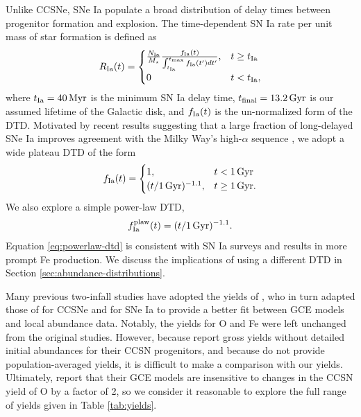 \documentclass[twocolumn,twocolappendix,linenumbers]{aastex631}
\begin{document}
Unlike CCSNe, SNe Ia populate a broad distribution of delay times between progenitor formation and explosion. The time-dependent SN Ia rate per unit mass of star formation is defined as
\begin{equation}
    R_{\rm Ia}(t) = 
    \begin{cases}
        \frac{N_{\rm Ia}}{M_\star}
        \frac{f_{\rm Ia}(t)}{\int_{t_{\rm Ia}}^{t_{\rm max}} f_{\rm Ia}(t') dt'}, & t \ge t_{\rm Ia} \\
        0 & t < t_{\rm Ia},
    \end{cases}
    \label{eq:dtd-function}
\end{equation}
where $t_{\rm Ia}=40\,{\rm Myr}$ is the minimum SN Ia delay time, $t_{\rm final}=13.2\,{\rm Gyr}$ is our assumed lifetime of the Galactic disk, and $f_{\rm Ia}(t)$ is the un-normalized form of the DTD. Motivated by recent results suggesting that a large fraction of long-delayed SNe Ia improves agreement with the Milky Way's high-$\alpha$ sequence \citep{palicio_analytic_2023,dubay_galactic_2024}, we adopt a wide plateau DTD of the form
\begin{equation}
    \label{eq:plateau-dtd}
    f_{\rm Ia}(t) =
    \begin{cases}
        1, & t < 1\,{\rm Gyr} \\
        (t/1\,{\rm Gyr})^{-1.1}, & t \ge 1\,{\rm Gyr}.
    \end{cases}
\end{equation}
We also explore a simple power-law DTD,
\begin{equation}
    f_{\rm Ia}^{\rm plaw}(t) = (t/1\,\rm{Gyr})^{-1.1}.
    \label{eq:powerlaw-dtd}
\end{equation}
Equation \ref{eq:powerlaw-dtd} is consistent with SN Ia surveys \citep[e.g.,][]{maoz_star_2017} and results in more prompt Fe production.
We discuss the implications of using a different DTD in Section \ref{sec:abundance-distributions}.

Many previous two-infall studies have adopted the yields of \citet{francois_evolution_2004}, who in turn adapted those of \citet{woosley_evolution_1995} for CCSNe and \citet{iwamoto_nucleosynthesis_1999} for SNe Ia to provide a better fit between GCE models and local abundance data. Notably, the yields for O and Fe were left unchanged from the original studies. However, because \citet{woosley_evolution_1995} report gross yields without detailed initial abundances for their CCSN progenitors, and because \citet{francois_evolution_2004} do not provide population-averaged yields, it is difficult to make a comparison with our yields. Ultimately, \citet{francois_evolution_2004} report that their GCE models are insensitive to changes in the CCSN yield of O by a factor of 2, so we consider it reasonable to explore the full range of yields given in Table \ref{tab:yields}.
\end{document}
